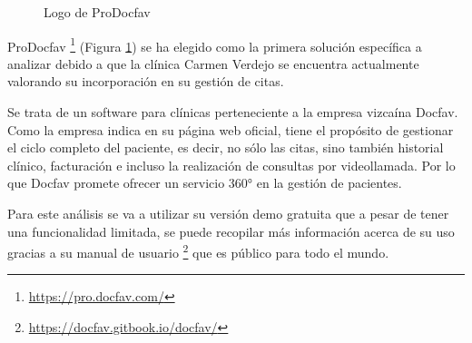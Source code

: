 \begin{figure}[H]
    \caption{Logo de ProDocfav}
    \label{fig:docfav-logo}
\end{figure}

ProDocfav \footnote{\url{https://pro.docfav.com/}} (Figura \ref{fig:docfav-logo}) se ha elegido como la primera solución específica a analizar debido a que la clínica Carmen Verdejo se encuentra actualmente valorando su incorporación en su gestión de citas. \bigskip

Se trata de un software para clínicas perteneciente a la empresa vizcaína Docfav. Como la empresa indica en su página web oficial, tiene el propósito de gestionar el ciclo completo del paciente, es decir, no sólo las citas, sino también historial clínico, facturación e incluso la realización de consultas por videollamada. Por lo que Docfav promete ofrecer un servicio 360° en la gestión de pacientes. \bigskip

Para este análisis se va a utilizar su versión demo gratuita que a pesar de tener una funcionalidad limitada, se puede recopilar más información acerca de su uso gracias a su manual de usuario \footnote{\url{ https://docfav.gitbook.io/docfav/}} que es público para todo el mundo. \bigskip

